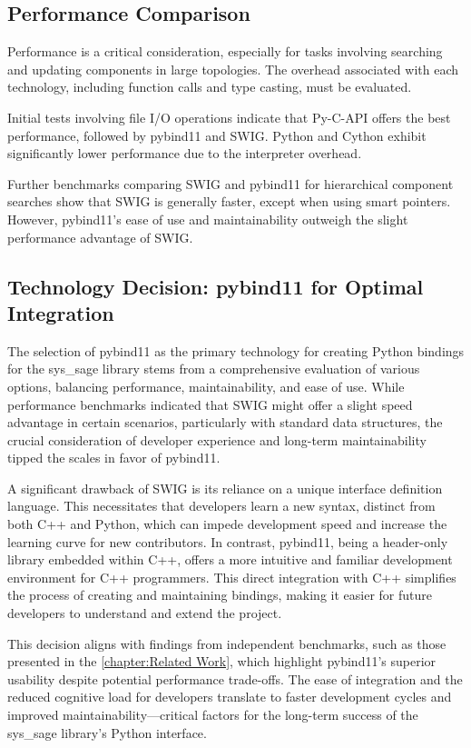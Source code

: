 \subsection{Performance Comparison}

Performance is a critical consideration, especially for tasks involving searching and updating components in large topologies. The overhead associated with each technology, including function calls and type casting, must be evaluated.

Initial tests involving file I/O operations indicate that Py-C-API offers the best performance, followed by pybind11 and SWIG. Python and Cython exhibit significantly lower performance due to the interpreter overhead.

Further benchmarks comparing SWIG and pybind11 for hierarchical component searches show that SWIG is generally faster, except when using smart pointers. However, pybind11's ease of use and maintainability outweigh the slight performance advantage of SWIG.


\subsection{Technology Decision: pybind11 for Optimal Integration}

The selection of pybind11 as the primary technology for creating Python bindings for the sys\_sage library stems from a comprehensive evaluation of various options, balancing performance, maintainability, and ease of use. While performance benchmarks indicated that SWIG might offer a slight speed advantage in certain scenarios, particularly with standard data structures, the crucial consideration of developer experience and long-term maintainability tipped the scales in favor of pybind11.

A significant drawback of SWIG is its reliance on a unique interface definition language. This necessitates that developers learn a new syntax, distinct from both C++ and Python, which can impede development speed and increase the learning curve for new contributors. In contrast, pybind11, being a header-only library embedded within C++, offers a more intuitive and familiar development environment for C++ programmers. This direct integration with C++ simplifies the process of creating and maintaining bindings, making it easier for future developers to understand and extend the project.

This decision aligns with findings from independent benchmarks, such as those presented in the \autoref{chapter:Related Work}, which highlight pybind11's superior usability despite potential performance trade-offs. The ease of integration and the reduced cognitive load for developers translate to faster development cycles and improved maintainability—critical factors for the long-term success of the sys\_sage library's Python interface.


